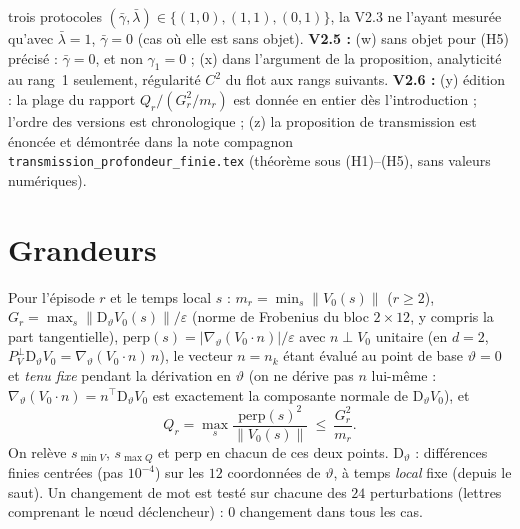 \documentclass[11pt,a4paper]{article}
\theoremstyle{remark}
\newcommand{\norm}[1]{\lVert #1\rVert}
\newcommand{\vth}{\vartheta}
\newcommand{\D}{\mathrm D}
\begin{document}
trois protocoles $(\bar\gamma,\bar\lambda)\in\{(1,0),(1,1),(0,1)\}$, la V2.3 ne l'ayant mesur\'ee qu'avec $\bar\lambda=1$, $\bar\gamma=0$ (cas o\`u elle est sans objet). \textbf{V2.5 :} (w) \og sans objet \fg{} pour (H5) pr\'ecis\'e : $\bar\gamma=0$, et non $\gamma_1=0$ ; (x) dans l'argument de la proposition, analyticit\'e au rang~1 seulement, r\'egularit\'e $C^2$ du flot aux rangs suivants. \textbf{V2.6 :} (y) \'edition : la plage du rapport $Q_r/(G_r^2/m_r)$ est donn\'ee en entier d\`es l'introduction ; l'ordre des versions est chronologique ; (z) la proposition de transmission est \'enonc\'ee et d\'emontr\'ee dans la note compagnon \texttt{transmission\_profondeur\_finie.tex} (th\'eor\`eme sous (H1)--(H5), sans valeurs num\'eriques).

\section{Grandeurs}
Pour l'\'episode $r$ et le temps local $s$ : $m_r=\min_s\norm{V_0(s)}$ ($r\ge2$), $G_r=\max_s\norm{\D_\vth V_0(s)}/\varepsilon$ (norme de Frobenius du bloc $2\times12$, y compris la part tangentielle), $\mathrm{perp}(s)=\lvert\nabla_\vth(V_0\!\cdot n)\rvert/\varepsilon$ avec $n\perp V_0$ unitaire (en $d=2$, $P^\perp_V\D_\vth V_0=\nabla_\vth(V_0\!\cdot n)\,n$), le vecteur $n=n_k$ \'etant \'evalu\'e au point de base $\vth=0$ et \emph{tenu fixe} pendant la d\'erivation en $\vth$ (on ne d\'erive pas $n$ lui-m\^eme : $\nabla_\vth(V_0\!\cdot n)=n^\top\D_\vth V_0$ est exactement la composante normale de $\D_\vth V_0$), et
\[
Q_r=\max_s\frac{\mathrm{perp}(s)^2}{\norm{V_0(s)}}\ \le\ \frac{G_r^2}{m_r}.
\]
On relève $s_{\min V}$, $s_{\max Q}$ et $\mathrm{perp}$ en chacun de ces deux points. $\D_\vth$ : diff\'erences finies centr\'ees (pas $10^{-4}$) sur les $12$ coordonn\'ees de $\vth$, \`a temps \emph{local} fixe (depuis le saut). Un changement de mot est test\'e sur chacune des $24$ perturbations (lettres comprenant le n\oe ud d\'eclencheur) : $0$ changement dans tous les cas.
\end{document}
